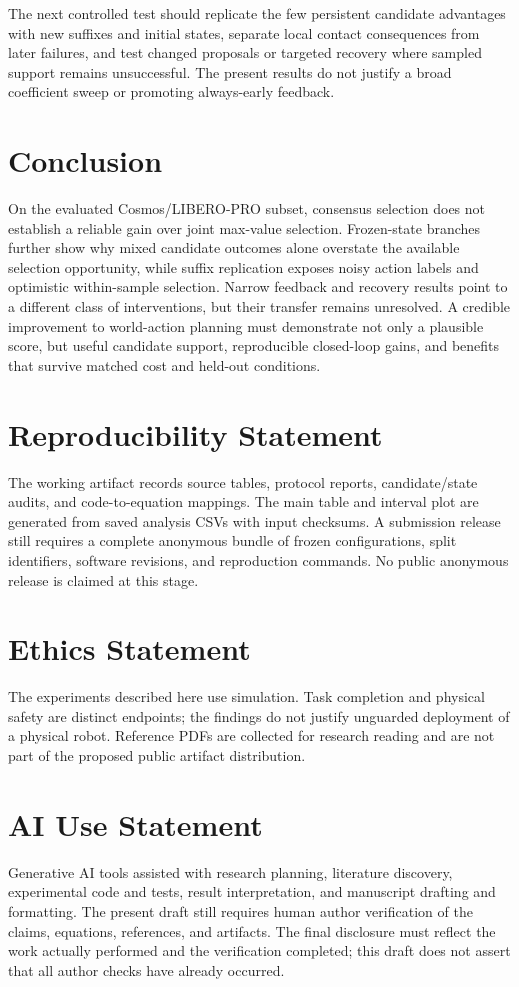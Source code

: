 \documentclass{article}
\begin{document}
The next controlled test should replicate the few persistent candidate
advantages with new suffixes and initial states, separate local contact
consequences from later failures, and test changed proposals or targeted
recovery where sampled support remains unsuccessful. The present results
do not justify a broad coefficient sweep or promoting always-early feedback.

\section{Conclusion}
On the evaluated Cosmos/LIBERO-PRO subset, consensus selection does not
establish a reliable gain over joint max-value selection. Frozen-state
branches further show why mixed candidate outcomes alone overstate the
available selection opportunity, while suffix replication exposes noisy
action labels and optimistic within-sample selection. Narrow feedback and recovery results point
to a different class of interventions, but their transfer remains unresolved.
A credible improvement to world-action planning must demonstrate not only a
plausible score, but useful candidate support, reproducible closed-loop gains,
and benefits that survive matched cost and held-out conditions.

\section*{Reproducibility Statement}
The working artifact records source tables, protocol reports, candidate/state
audits, and code-to-equation mappings. The main table and interval plot are
generated from saved analysis CSVs with input checksums. A submission release
still requires a complete anonymous bundle of frozen configurations, split
identifiers, software revisions, and reproduction commands. No public
anonymous release is claimed at this stage.

\section*{Ethics Statement}
The experiments described here use simulation. Task completion and physical
safety are distinct endpoints; the findings do not justify unguarded
deployment of a physical robot. Reference PDFs are collected for research
reading and are not part of the proposed public artifact distribution.

\section*{AI Use Statement}
Generative AI tools assisted with research planning, literature discovery,
experimental code and tests, result interpretation, and manuscript drafting
and formatting. The present draft still requires human author verification
of the claims, equations, references, and artifacts. The final disclosure
must reflect the work actually performed and the verification completed;
this draft does not assert that all author checks have already occurred.
\end{document}
